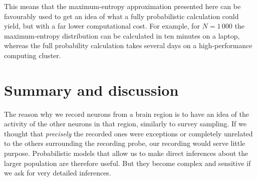 \documentclass[\ifafour a4paper,12pt,\else a5paper,10pt,\fi%
onecolumn,oneside,article,%
british%
]{memoir}
\makeatletter
\theoremstyle{remark}
\theoremstyle{innote}
\def\sum{\DOTSI\sumop\slimits@}
\def\prod{\DOTSI\prodop\slimits@}
\newcommand*{\citep}{\footcites}
\newcommand*{\defd}{\coloneqq}
\newcommand*{\pf}{\mathrm{p}}%
\renewcommand*{\|}{\nonscript\,\vert\nonscript\;\mathopen{}}
\newcommand*{\yAv}{A}
\newcommand*{\yFF}{F}
\newcommand*{\yF}{\bm{\yFF}}
\newcommand*{\yA}{\yAv}%
\newcommand*{\yI}{\varIota}
\newcommand*{\re}{\Eta}
\newcommand*{\yL}{L}
\makeatother
\begin{document}
This means that the maximum-entropy approximation presented here can be
favourably used to get an idea of what a fully probabilistic calculation
could yield, but with a far lower computational cost. For example, for
$N=1\,000$ the maximum-entropy distribution can be calculated in ten
minutes on a laptop, whereas the full probability calculation takes several
days on a high-performance computing cluster.







\section{Summary and discussion}
\label{sec:summary_discussion}

The reason why we record neurons from a brain region is to have an idea of
the activity of the other neurons in that region, similarly to survey
sampling. If we thought that \emph{precisely} the recorded ones were
exceptions or completely unrelated to the others surrounding the recording
probe, our recording would serve little purpose. Probabilistic models that
allow us to make direct inferences about the larger population are
therefore useful. But they become complex and sensitive if we ask for very
detailed inferences.
\end{document}
